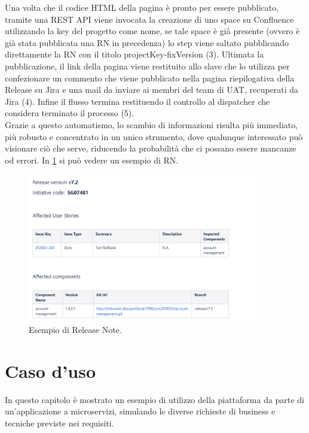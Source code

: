 \documentclass[a4paper, 12pt]{report}
\numberwithin{equation}{section}
\begin{document}
Una volta che il codice HTML della pagina è pronto per essere pubblicato, tramite una REST API viene invocata la creazione di uno space su Confluence utilizzando la key del progetto come nome, se tale space è già presente (ovvero è già stata pubblicata una RN in precedenza) lo step viene saltato pubblicando direttamente la RN con il titolo projectKey-fixVersion (3). Ultimata la pubblicazione, il link della pagina viene restituito allo slave che lo utilizza per confezionare un commento che viene pubblicato nella pagina riepilogativa della Release su Jira e una mail da inviare ai membri del team di UAT, recuperati da Jira (4). Infine il flusso termina restituendo il controllo al dispatcher che considera terminato il processo (5).\\
Grazie a questo automatismo, lo scambio di informazioni risulta più immediato, più robusto e concentrato in un unico strumento, dove qualunque interessato può visionare ciò che serve, riducendo la probabilità che ci possano essere mancanze od errori. In \ref{fig:release-note} si può vedere un esempio di RN.
\begin{figure}
    \centering
    \includegraphics[width=0.9\textwidth]{imgs/release-note.png}
    \caption{Esempio di Release Note.}
    \label{fig:release-note}
\end{figure}

\chapter{Caso d'uso}\label{piattaforma-devops}
In questo capitolo è mostrato un esempio di utilizzo della piattaforma da parte di un'applicazione a microservizi, simulando le diverse richieste di business e tecniche previste nei requisiti.
\end{document}
